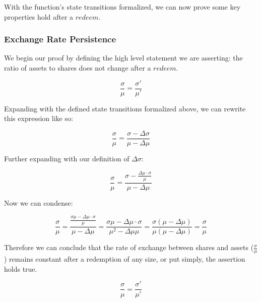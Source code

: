 \documentclass{article}
\begin{document}
With the function's state transitions formalized, we can now prove some key properties hold after a $redeem$.

\subsubsection{Exchange Rate Persistence}

We begin our proof by defining the high level statement we are asserting: the ratio of assets to shares does not change after a $redeem$.

$$ \frac{\sigma}{\mu} = \frac{\sigma'}{\mu'} $$

Expanding with the defined state transitions formalized above, we can rewrite this expression like so:

$$ \frac{\sigma}{\mu} = \frac{\sigma - \Delta\sigma}{\mu - \Delta\mu} $$

Further expanding with our definition of $\Delta\sigma$:

$$ \frac{\sigma}{\mu} = \frac{\sigma - \frac{\Delta\mu \cdot \sigma}{\mu}}{\mu - \Delta\mu} $$

Now we can condense:

$$ \frac{\sigma}{\mu} = \frac{\frac{\sigma\mu - \Delta\mu \cdot \sigma}{\mu}}{\mu - \Delta\mu} = \frac{\sigma\mu - \Delta\mu \cdot \sigma}{\mu^{2} - \Delta\mu\mu} = \frac{\sigma(\mu - \Delta\mu)}{\mu(\mu - \Delta\mu)} = \frac{\sigma}{\mu} $$

Therefore we can conclude that the rate of exchange between shares and assets ($\frac{\sigma}{\mu}$) remains constant after a redemption of any size, or put simply, the assertion holds true.

$$ \frac{\sigma}{\mu} = \frac{\sigma'}{\mu'} $$
\end{document}
